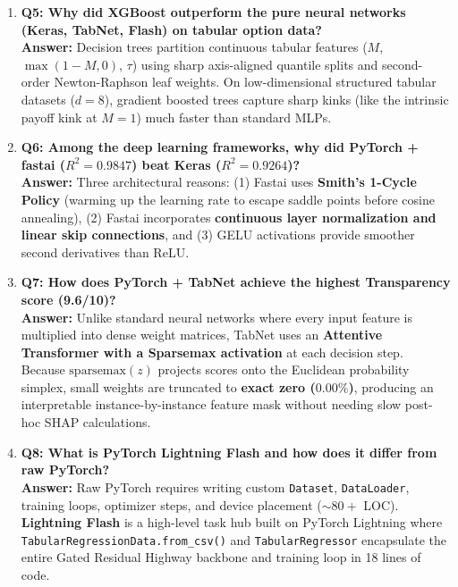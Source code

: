 \documentclass[10pt]{article}
\begin{document}
\begin{enumerate}
    \item \textbf{\color{crimson}Q5: Why did XGBoost outperform the pure neural networks (Keras, TabNet, Flash) on tabular option data?}\\
    \textbf{Answer:} Decision trees partition continuous tabular features ($M$, $\max(1-M,0)$, $\tau$) using sharp axis-aligned quantile splits and second-order Newton-Raphson leaf weights. On low-dimensional structured tabular datasets ($d=8$), gradient boosted trees capture sharp kinks (like the intrinsic payoff kink at $M=1$) much faster than standard MLPs.

    \item \textbf{\color{crimson}Q6: Among the deep learning frameworks, why did PyTorch + fastai ($R^2 = 0.9847$) beat Keras ($R^2 = 0.9264$)?}\\
    \textbf{Answer:} Three architectural reasons: (1) Fastai uses \textbf{Smith's 1-Cycle Policy} (warming up the learning rate to escape saddle points before cosine annealing), (2) Fastai incorporates \textbf{continuous layer normalization and linear skip connections}, and (3) GELU activations provide smoother second derivatives than ReLU.

    \item \textbf{\color{crimson}Q7: How does PyTorch + TabNet achieve the highest Transparency score (9.6/10)?}\\
    \textbf{Answer:} Unlike standard neural networks where every input feature is multiplied into dense weight matrices, TabNet uses an \textbf{Attentive Transformer with a Sparsemax activation} at each decision step. Because $\text{sparsemax}(z)$ projects scores onto the Euclidean probability simplex, small weights are truncated to \textbf{exact zero ($0.00\%$)}, producing an interpretable instance-by-instance feature mask without needing slow post-hoc SHAP calculations.

    \item \textbf{\color{crimson}Q8: What is PyTorch Lightning Flash and how does it differ from raw PyTorch?}\\
    \textbf{Answer:} Raw PyTorch requires writing custom \texttt{Dataset}, \texttt{DataLoader}, training loops, optimizer steps, and device placement ($\sim 80+$ LOC). \textbf{Lightning Flash} is a high-level task hub built on PyTorch Lightning where \texttt{TabularRegressionData.from\_csv()} and \texttt{TabularRegressor} encapsulate the entire Gated Residual Highway backbone and training loop in 18 lines of code.


\end{enumerate}
\end{document}
